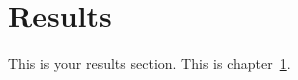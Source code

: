 \chapter{Results}
\label{ch:results}

This is your results section. This is chapter~\ref{ch:results}.